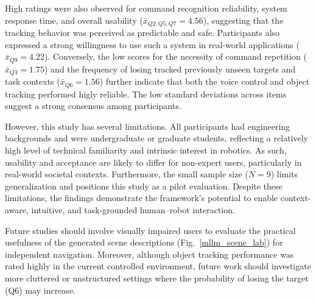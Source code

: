\documentclass[lettersize,journal]{IEEEtran}
\begin{document}
High ratings were also observed for command recognition reliability, system response time, and overall usability ($\bar{x}_{Q2,Q5,Q7} = 4.56$), suggesting that the tracking behavior was perceived as predictable and safe. Participants also expressed a strong willingness to use such a system in real-world applications ($\bar{x}_{Q9} = 4.22$). Conversely, the low scores for the necessity of command repetition ($\bar{x}_{Q3} = 1.75$) and the frequency of losing  tracked   previously unseen targets and task contexts ($\bar{x}_{Q6} = 1.56$) further indicate that both the voice control and object tracking performed higly reliable. The low standard deviations across items suggest a strong consensus among participants.


However, this study has several limitations. All participants had engineering backgrounds and were undergraduate or graduate students, reflecting a relatively high level of technical familiarity and intrinsic interest in robotics. As such, usability and acceptance are likely to differ for non-expert users, particularly in real-world societal contexts. Furthermore, the small sample size ($N=9$) limits generalization and positions this study as a pilot evaluation. Despite these limitations, the findings demonstrate the framework’s potential to enable context-aware, intuitive, and task-grounded human–robot interaction.

Future studies should involve visually impaired users to evaluate the practical usefulness of the generated scene descriptions (Fig.~\ref{mllm_scene_lab}) for independent navigation. Moreover, although object tracking performance was rated highly in the current controlled environment, future work should investigate more cluttered or unstructured settings where the probability of losing the target (Q6) may increase.
\end{document}
